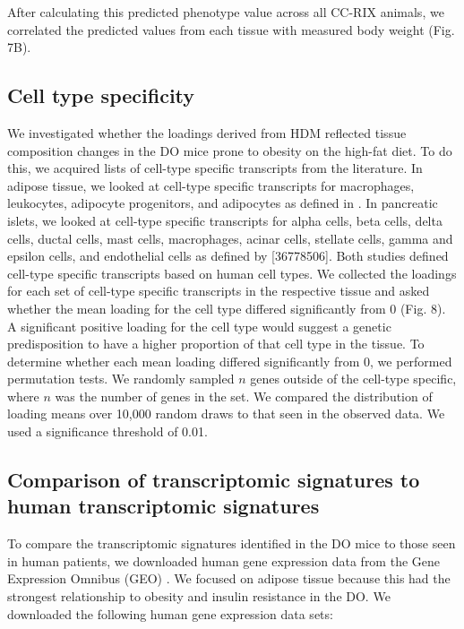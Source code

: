 \documentclass[
]{article}
\begin{document}
After calculating this predicted phenotype value across all CC-RIX
animals, we correlated the predicted values from each tissue with
measured body weight (Fig. 7B).

\subsection{Cell type specificity}\label{cell-type-specificity}

We investigated whether the loadings derived from HDM reflected tissue
composition changes in the DO mice prone to obesity on the high-fat
diet. To do this, we acquired lists of cell-type specific transcripts
from the literature. In adipose tissue, we looked at cell-type specific
transcripts for macrophages, leukocytes, adipocyte progenitors, and
adipocytes as defined in \cite{pmid29087381}. In pancreatic islets, we
looked at cell-type specific transcripts for alpha cells, beta cells,
delta cells, ductal cells, mast cells, macrophages, acinar cells,
stellate cells, gamma and epsilon cells, and endothelial cells as
defined by {[}36778506{]}. Both studies defined cell-type specific
transcripts based on human cell types. We collected the loadings for
each set of cell-type specific transcripts in the respective tissue and
asked whether the mean loading for the cell type differed significantly
from 0 (Fig. 8). A significant positive loading for the cell type would
suggest a genetic predisposition to have a higher proportion of that
cell type in the tissue. To determine whether each mean loading differed
significantly from 0, we performed permutation tests. We randomly
sampled \(n\) genes outside of the cell-type specific, where \(n\) was
the number of genes in the set. We compared the distribution of loading
means over 10,000 random draws to that seen in the observed data. We
used a significance threshold of 0.01.

\subsection{Comparison of transcriptomic signatures to human
transcriptomic
signatures}\label{comparison-of-transcriptomic-signatures-to-human-transcriptomic-signatures}

To compare the transcriptomic signatures identified in the DO mice to
those seen in human patients, we downloaded human gene expression data
from the Gene Expression Omnibus (GEO)
\cite{pmid37933855, pmid11752295}. We focused on adipose tissue because
this had the strongest relationship to obesity and insulin resistance in
the DO. We downloaded the following human gene expression data sets:
\end{document}
